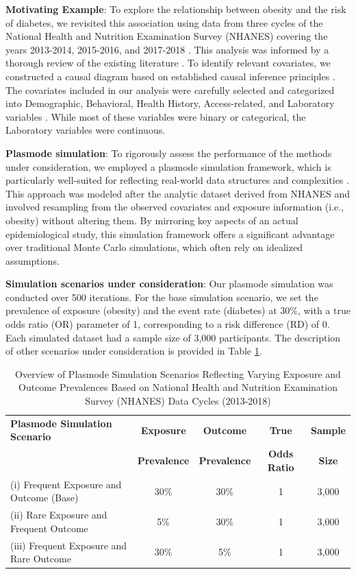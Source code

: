 \documentclass[sn-vancouver,Numbered,lineno,pdflatex]{sn-jnl}
\begin{document}
\textbf{Motivating Example}: To explore the relationship between obesity
and the risk of diabetes, we revisited this association using data from
three cycles of the National Health and Nutrition Examination Survey
(NHANES) covering the years 2013-2014, 2015-2016, and 2017-2018
\citep{karim2024high}. This analysis was informed by a thorough review
of the existing literature
\citep{saydah2014trends, liu2013association, kabadi2012joint, ostchega2012abdominal}.
To identify relevant covariates, we constructed a causal diagram based
on established causal inference principles \citep{greenland1999causal}.
The covariates included in our analysis were carefully selected and
categorized into Demographic, Behavioral, Health History,
Access-related, and Laboratory variables \citep{karim2024high}. While
most of these variables were binary or categorical, the Laboratory
variables were continuous.

\textbf{Plasmode simulation}: To rigorously assess the performance of
the methods under consideration, we employed a plasmode simulation
framework, which is particularly well-suited for reflecting real-world
data structures and complexities \citep{franklin2014plasmode}. This
approach was modeled after the analytic dataset derived from NHANES and
involved resampling from the observed covariates and exposure
information (i.e., obesity) without altering them. By mirroring key
aspects of an actual epidemiological study, this simulation framework
offers a significant advantage over traditional Monte Carlo simulations,
which often rely on idealized assumptions.

\textbf{Simulation scenarios under consideration}: Our plasmode
simulation was conducted over 500 iterations. For the base simulation
scenario, we set the prevalence of exposure (obesity) and the event rate
(diabetes) at 30\%, with a true odds ratio (OR) parameter of 1,
corresponding to a risk difference (RD) of 0. Each simulated dataset had
a sample size of 3,000 participants. The description of other scenarios
under consideration is provided in Table \ref{table:scenarios}.

\begin{table}[ht]
\centering
\caption{Overview of Plasmode Simulation Scenarios Reflecting Varying Exposure and Outcome Prevalences Based on National Health and Nutrition Examination Survey (NHANES) Data Cycles (2013-2018)}
\label{table:scenarios}
\begin{tabular}{lcccc}
  \toprule
  \textbf{Plasmode Simulation Scenario} & \textbf{Exposure} & \textbf{Outcome} & \textbf{True} & \textbf{Sample}\\
  \textbf{} & \textbf{Prevalence} & \textbf{Prevalence} & \textbf{Odds Ratio} & \textbf{Size}\\
  \midrule
  (i) Frequent Exposure and Outcome (Base) & 30\% & 30\% & 1 & 3,000 \\
  (ii) Rare Exposure and Frequent Outcome & 5\% & 30\% & 1 & 3,000 \\
  (iii) Frequent Exposure and Rare Outcome & 30\% & 5\% & 1 & 3,000 \\
  \bottomrule
\end{tabular}
\end{table}
\end{document}
